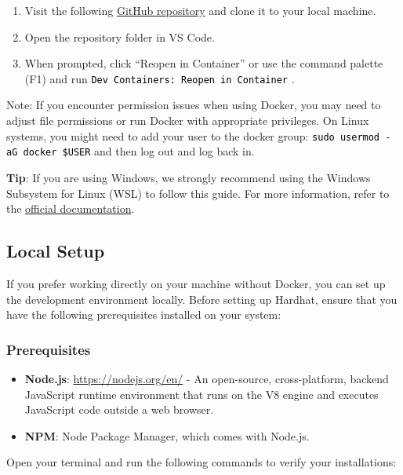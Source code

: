 \documentclass[12pt]{article}
\newcommand{\codegrey}[1]{%
  \texttt{\colorbox{black!4}{\textcolor{black}{#1}}}%
}
\begin{document}
\begin{enumerate}
    \item Visit the following
          \href{https://github.com/radovluk/Smart-Contract-Exercise/tree/main/01-Hello-Blockchain-World/task/task-code}{GitHub repository} and clone it to your local machine.
    \item Open the repository folder in VS Code.
    \item When prompted, click ``Reopen in Container'' or use the command palette (F1)
          and run \codegrey{Dev Containers: Reopen in Container}.
\end{enumerate}

\noindent
Note: If you encounter permission issues when using Docker, you may need to adjust file permissions or run Docker with appropriate privileges. On Linux systems, you might need to add your user to the docker group: \codegrey{sudo usermod -aG docker \$USER} and then log out and log back in.

\medskip
\noindent
\textbf{Tip}: If you are using Windows, we strongly recommend using the Windows Subsystem for Linux (WSL) to follow this guide. For more information, refer to the \href{https://learn.microsoft.com/en-us/windows/wsl/about}{official documentation}.

\subsection{Local Setup}

If you prefer working directly on your machine without Docker, you can set up
the development environment locally. Before setting up Hardhat, ensure that you
have the following prerequisites installed on your system:

\subsubsection*{Prerequisites}
\begin{itemize}
    \item \textbf{Node.js}: \url{https://nodejs.org/en/} - An open-source, cross-platform, backend JavaScript runtime environment that runs on the V8 engine and executes JavaScript code outside a web browser.
    \item \textbf{NPM}: Node Package Manager, which comes with Node.js.
\end{itemize}

\noindent
Open your terminal and run the following commands to verify your installations:
\end{document}
